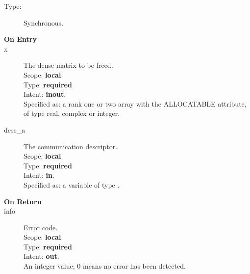 \begin{description}
\item[Type:] Synchronous.
\item[\bf On Entry]
\item[x] The dense matrix to
  be freed.\\
Scope: {\bf local} \\
Type: {\bf required}\\
Intent: {\bf inout}.\\
Specified as: a rank one or two array with the ALLOCATABLE
attribute, of type real, complex or integer.\\

\item[desc\_a] The communication descriptor.\\
Scope: {\bf local} \\
Type: {\bf required}\\
Intent: {\bf in}.\\
Specified as: a variable of type \descdata.\\
\end{description}

\begin{description}
\item[\bf On Return]
\item[info] Error code.\\
Scope: {\bf local} \\
Type: {\bf required} \\
Intent: {\bf out}.\\
An integer value; 0 means no error has been detected. 
\end{description}


%
%


